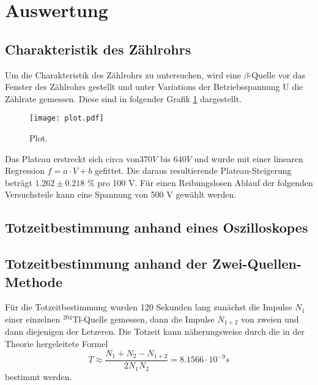 \section{Auswertung}
\label{sec:Auswertung}

\subsection{Charakteristik des Zählrohrs}
  Um die Charakteristik des Zählrohrs zu untersuchen, wird eine $\beta$-Quelle vor das 
  Fenster des Zählrohrs gestellt und unter Variations der Betriebsspannung U die 
  Zählrate gemessen. Diese sind in folgender Grafik \ref{fig:plot} dargestellt.
  \begin{figure}
    \centering
    \texttt{[image: plot.pdf]}
    \caption{Plot.}
    \label{fig:plot}
  \end{figure}
  Das Plateau erstreckt sich circa von$370 V$ bis $640 V$ und wurde mit einer linearen 
  Regression $f = a\cdot V + b$ gefittet. Die daraus resultierende Plateau-Steigerung 
  beträgt $1.262 \pm 0.218$ \% pro 100 V. Für einen Reibungslosen Ablauf der folgenden 
  Versuchsteile kann eine Spannung von 500 V gewählt werden.

\subsection{Totzeitbestimmung anhand eines Oszilloskopes}

\subsection{Totzeitbestimmung anhand der Zwei-Quellen-Methode}
  Für die Totzeitbestimmung wurden 120 Sekunden lang zunächst die Impulse $N_1$ einer einzelnen
  $^{204}$Tl-Quelle gemessen, dann die Impulse $N_{1+2}$ von zweien und dann diejenigen der 
  Letzeren. Die Totzeit kann näherungsweise durch die in der Theorie hergeleitete Formel 
  \begin{equation*}
  T \approx \dfrac{N_1+N_2-N_{1+2}}{2N_1N_2}= 8.1566 \cdot 10^{-9} s
  \end{equation*}
  bestimmt werden.
